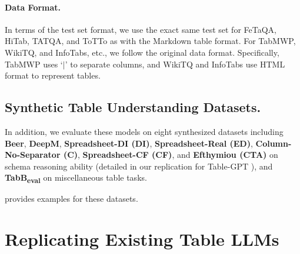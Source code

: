 \documentclass[11pt]{article}
\begin{document}
\paragraph{Data Format.}
In terms of the test set format, we use the exact same test set for FeTaQA, HiTab, TATQA, and ToTTo as \citet{zhang-etal-2024-tablellama} with the Markdown table format.
For TabMWP, WikiTQ, and InfoTabs, etc., we follow the original data format.
Specifically, TabMWP uses `$|$' to separate columns, and WikiTQ and InfoTabs use HTML format to represent tables.

\subsection{Synthetic Table Understanding Datasets.}
In addition, we evaluate these models on eight synthesized datasets including \textbf{Beer}, \textbf{DeepM}, \textbf{Spreadsheet-DI (DI)}, \textbf{Spreadsheet-Real (ED)}, \textbf{Column-No-Separator (C)}, \textbf{Spreadsheet-CF (CF)}, and \textbf{Efthymiou (CTA)} \citep{li2023table} on schema reasoning ability (detailed in our replication for Table-GPT ), and \textbf{TabB\textsubscript{eval}} \citep{wu2025tablebench} on miscellaneous table tasks.

 provides examples for these datasets.



\section{Replicating Existing Table LLMs}
\label{app-sec: reimpl-compare}
\end{document}
